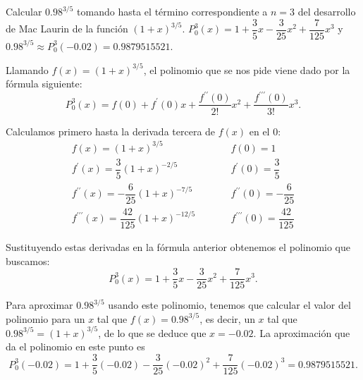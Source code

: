{Calcular $0.98^{3/5}$ tomando hasta el término correspondiente a $n=3$ del desarrollo de Mac Laurin de la función $(1+x)^{3/5}$.
}
{$P_{0}^{3}(x)=1+\dfrac{3}{5}x-\dfrac{3}{25}x^{2}+\dfrac{7}{125}x^{3}$ y $0.98^{3/5}\approx P_{0}^{3}(-0.02)= 0.9879515521$.
}
{Llamando $f(x)=(1+x)^{3/5}$, el polinomio que se nos pide viene dado por la fórmula siguiente:
\[
P_{0}^{3}(x)=f(0)+f^{\prime }(0)x+\frac{f^{\prime \prime }(0)}{2!}x^{2}+\frac{f^{\prime \prime \prime }(0)}{3!}x^{3}.
\]

Calculamos primero hasta la derivada tercera de $f(x)$ en el $0$:
\[
\renewcommand{\arraystretch}{2}
\begin{array}{lll}
f(x)=(1+x) ^{3/5} & \qquad & f(0)=1 \\
f^{\prime}(x)=\dfrac{3}{5}(1+x)^{-2/5} & & f^{\prime }(0)=\dfrac{3}{5}\\
f^{\prime \prime}(x)=-\dfrac{6}{25}(1+x)^{-7/5} & & f^{\prime \prime }(0)=-\dfrac{6}{25}\\
f^{\prime \prime \prime}(x)=\dfrac{42}{125}(1+x)^{-12/5} & & f^{\prime \prime \prime }(0)=\dfrac{42}{125}
\end{array}
\]

Sustituyendo estas derivadas en la fórmula anterior obtenemos el polinomio que buscamos:
\[
P_{0}^{3}(x)=1+\dfrac{3}{5}x-\dfrac{3}{25}x^{2}+\frac{7}{125}x^{3}.
\]

Para aproximar $0.98^{3/5}$ usando este polinomio, tenemos que calcular el valor del polinomio para un $x$ tal que $f(x)=0.98^{3/5}$, es decir, un $x$ tal que $0.98^{3/5}=(1+x)^{3/5}$, de lo que se deduce que $x=-0.02$. La aproximación que da el polinomio en este punto es
\[
P_{0}^{3}(-0.02)=1+\dfrac{3}{5}(-0.02)-\dfrac{3}{25}(-0.02)^{2}+\frac{7}{125}(-0.02)^{3}=0.9879515521.
\]
}


